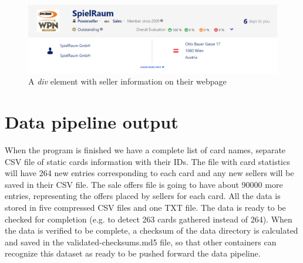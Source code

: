 \begin{figure}
      \centering
      \includegraphics[width=\textwidth]{figures/seller_page.png}
      \caption{A \textit{div} element with seller information on their webpage}
      \label{fig:seller_page}
\end{figure}

\section{Data pipeline output}
When the program is finished we have a complete list of card names, separate CSV file of static cards information with their IDs. The file with card statistics will have 264 new entries corresponding to each card and any new sellers will be saved in their CSV file. The sale offers file is going to have about 90000 more entries, representing the offers placed by sellers for each card. All the data is stored in five compressed CSV files and one TXT file. The data is ready to be checked for completion (e.g. to detect 263 cards gathered instead of 264). When the data is verified to be complete, a checksum of the data directory is calculated and saved in the validated-checksums.md5 file, so that other containers can recognize this dataset as ready to be pushed forward the data pipeline.
